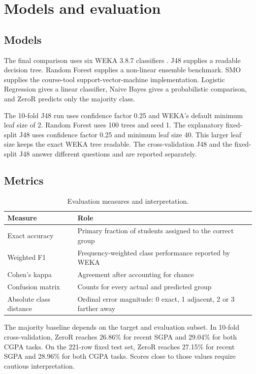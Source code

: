 \section{Models and evaluation}
\subsection{Models}
The final comparison uses six WEKA 3.8.7 classifiers \cite{weka2009}. J48 supplies a readable decision tree. Random Forest supplies a non-linear ensemble benchmark. SMO supplies the course-tool support-vector-machine implementation. Logistic Regression gives a linear classifier, Naive Bayes gives a probabilistic comparison, and ZeroR predicts only the majority class.

The 10-fold J48 run uses confidence factor 0.25 and WEKA's default minimum leaf size of 2. Random Forest uses 100 trees and seed 1. The explanatory fixed-split J48 uses confidence factor 0.25 and minimum leaf size 40. This larger leaf size keeps the exact WEKA tree readable. The cross-validation J48 and the fixed-split J48 answer different questions and are reported separately.

\subsection{Metrics}
\begin{table}[H]\centering
\caption{Evaluation measures and interpretation.}\label{tab:metrics}
\begin{tabularx}{\textwidth}{p{}Y}\toprule
Measure&Role\\\midrule
Exact accuracy&Primary fraction of students assigned to the correct group\\
Weighted F1&Frequency-weighted class performance reported by WEKA\\
Cohen's kappa&Agreement after accounting for chance\\
Confusion matrix&Counts for every actual and predicted group\\
Absolute class distance&Ordinal error magnitude: 0 exact, 1 adjacent, 2 or 3 farther away\\\bottomrule
\end{tabularx}
\end{table}

The majority baseline depends on the target and evaluation subset. In 10-fold cross-validation, ZeroR reaches 26.86\% for recent SGPA and 29.04\% for both CGPA tasks. On the 221-row fixed test set, ZeroR reaches 27.15\% for recent SGPA and 28.96\% for both CGPA tasks. Scores close to those values require cautious interpretation.
